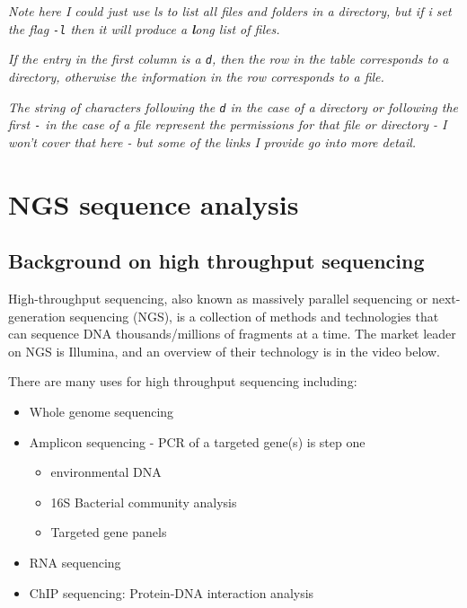 \documentclass[
]{book}
\providecommand{\tightlist}{%
  \setlength{\itemsep}{0pt}\setlength{\parskip}{0pt}}
\begin{document}
\emph{Note here I could just use ls to list all files and folders in a directory, but if i set the flag \texttt{-l} then it will produce a \textbf{l}ong list of files.}

\emph{If the entry in the first column is a \texttt{d}, then the row in the table corresponds to a directory, otherwise the information in the row corresponds to a file.}

\emph{The string of characters following the \texttt{d} in the case of a directory or following the first \texttt{-} in the case of a file represent the permissions for that file or directory - I won't cover that here - but some of the links I provide go into more detail.}

\hypertarget{ngs-sequence-analysis}{%
\chapter{NGS sequence analysis}\label{ngs-sequence-analysis}}

\hypertarget{background-on-high-throughput-sequencing}{%
\section{Background on high throughput sequencing}\label{background-on-high-throughput-sequencing}}

High-throughput sequencing, also known as massively parallel sequencing or next-generation sequencing (NGS), is a collection of methods and technologies that can sequence DNA thousands/millions of fragments at a time. The market leader on NGS is Illumina, and an overview of their technology is in the video below.

There are many uses for high throughput sequencing including:

\begin{itemize}
\item
  Whole genome sequencing
\item
  Amplicon sequencing - PCR of a targeted gene(s) is step one

  \begin{itemize}
  \tightlist
  \item
    environmental DNA
  \item
    16S Bacterial community analysis
  \item
    Targeted gene panels
  \end{itemize}
\item
  RNA sequencing
\item
  ChIP sequencing: Protein-DNA interaction analysis
\end{itemize}
\end{document}
